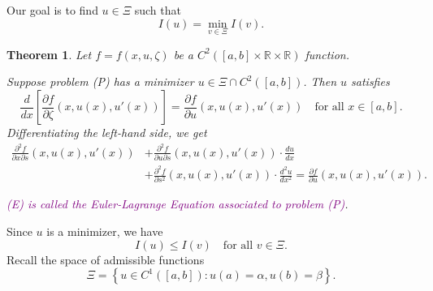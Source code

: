 \documentclass[12pt]{report}
\newtheorem{theorem}{Theorem}[section]
\begin{document}
Our goal is to find $ u \in \Xi $ such that
\begin{equation}
    I(u) = \min_{v \in \Xi} I(v). \tag{P}
\end{equation}
\begin{theorem}
Let $ f = f(x,u,\zeta) $ be a $ C^2([a,b] \times \mathbb{R} \times \mathbb{R}) $ function.

Suppose problem (P) has a minimizer $ u \in \Xi \cap C^2([a,b]) $. Then $ u $ satisfies
\begin{equation}
    \frac{d}{dx} \left[ \frac{\partial f}{\partial \zeta} (x, u(x), u'(x)) \right] = \frac{\partial f}{\partial u} (x, u(x), u'(x)) \quad \text{for all } x \in [a,b]. \tag{E}
\end{equation}
Differentiating the left-hand side, we get
\begin{align*}
    \frac{\partial^2 f}{\partial x \partial s} (x, u(x), u'(x)) &+ \frac{\partial^2 f}{\partial u \partial s} (x, u(x), u'(x)) \cdot \frac{du}{dx} \\
    &+ \frac{\partial^2 f}{\partial s^2} (x, u(x), u'(x)) \cdot \frac{d^2 u}{dx^2} = \frac{\partial f}{\partial u} (x, u(x), u'(x)).
\end{align*}

\textcolor{purple}{(E) is called the Euler-Lagrange Equation associated to problem (P)}.
\end{theorem}
Since $u$ is a minimizer, we have
\begin{equation}
    I(u) \leq I(v) \quad \text{for all } v \in \Xi.
\end{equation}
Recall the space of admissible functions
\begin{equation}
    \Xi = \left\{ u \in C^1([a,b]) : u(a) = \alpha, u(b) = \beta \right\}.
\end{equation}
\end{document}
